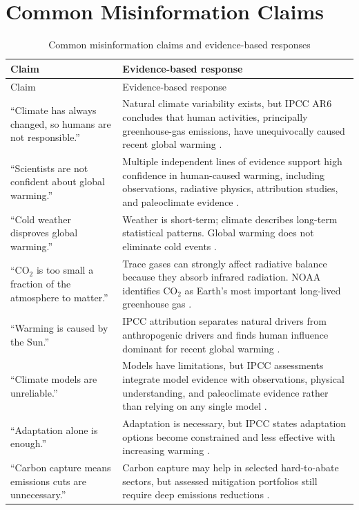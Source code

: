 \documentclass[12pt]{article}
\begin{document}
\section{Common Misinformation Claims}

\begin{longtable}{p{}p{}}
\caption{Common misinformation claims and evidence-based responses}\\
\toprule
Claim & Evidence-based response \\
\midrule
\endfirsthead
\toprule
Claim & Evidence-based response \\
\midrule
\endhead
``Climate has always changed, so humans are not responsible.'' & Natural climate variability exists, but IPCC AR6 concludes that human activities, principally greenhouse-gas emissions, have unequivocally caused recent global warming \cite{ref1}. \\
``Scientists are not confident about global warming.'' & Multiple independent lines of evidence support high confidence in human-caused warming, including observations, radiative physics, attribution studies, and paleoclimate evidence \cite{ref1,ref5}. \\
``Cold weather disproves global warming.'' & Weather is short-term; climate describes long-term statistical patterns. Global warming does not eliminate cold events \cite{ref2}. \\
``CO$_2$ is too small a fraction of the atmosphere to matter.'' & Trace gases can strongly affect radiative balance because they absorb infrared radiation. NOAA identifies CO$_2$ as Earth's most important long-lived greenhouse gas \cite{ref3}. \\
``Warming is caused by the Sun.'' & IPCC attribution separates natural drivers from anthropogenic drivers and finds human influence dominant for recent global warming \cite{ref1}. \\
``Climate models are unreliable.'' & Models have limitations, but IPCC assessments integrate model evidence with observations, physical understanding, and paleoclimate evidence rather than relying on any single model \cite{ref6}. \\
``Adaptation alone is enough.'' & Adaptation is necessary, but IPCC states adaptation options become constrained and less effective with increasing warming \cite{ref1}. \\
``Carbon capture means emissions cuts are unnecessary.'' & Carbon capture may help in selected hard-to-abate sectors, but assessed mitigation portfolios still require deep emissions reductions \cite{ref1,ref6}. \\
\bottomrule
\end{longtable}
\end{document}
